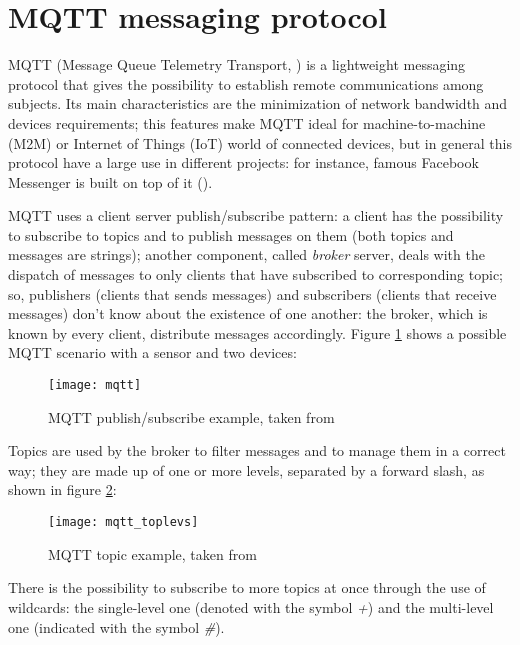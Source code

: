 \section{MQTT messaging protocol}\label{mqtt}

MQTT (Message Queue Telemetry Transport, \cite{banks2014mqtt}) is a light\-weight messaging protocol that gives the possibility to establish remote communications among subjects. Its main characteristics are the minimization of network bandwidth and devices requirements; this features make MQTT ideal for machine-to-machine (M2M) or Internet of Things (IoT) world of connected devices, but in general this protocol have a large use in different projects: for instance, famous Facebook Messenger is built on top of it (\cite{zhang2011building}).

MQTT uses a client server publish\slash{}subscribe pattern: a client has the possibility to subscribe to topics and to publish messages on them (both topics and messages are strings); another component, called \textit{broker} server, deals with the dispatch of messages to only clients that have subscribed to corresponding topic; so, publishers (clients that sends messages) and subscribers (clients that receive messages) don't know about the existence of one another: the broker, which is known by every client, distribute messages accordingly. Figure \ref{fig::mqtt_example} shows a possible MQTT scenario with a sensor and two devices:

\begin{figure}[H]

    \centering
    \texttt{[image: mqtt]}
    \caption{MQTT publish/subscribe example, taken from \cite{site:hivemq}}
    \label{fig::mqtt_example}

\end{figure}

Topics are used by the broker to filter messages and to manage them in a correct way; they are made up of one or more levels, separated by a forward slash, as shown in figure \ref{fig::topic}:

\begin{figure}[H]

    \centering
    \texttt{[image: mqtt\_toplevs]}
    \caption{MQTT topic example, taken from \cite{site:hivemq}}
    \label{fig::topic}

\end{figure}

There is the possibility to subscribe to more topics at once through the use of wildcards: the single-level one (denoted with the symbol \textit{+}) and the multi-level one (indicated with the symbol \textit{\#}).

